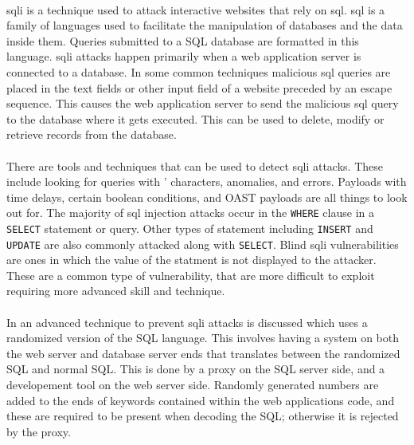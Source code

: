 \paragraph{}\acrfull{sqli} is a technique used to attack interactive websites that rely on \acrfull{sql}. \acrfull{sql} is a family of languages used to facilitate the manipulation of databases and the data inside them. Queries submitted to a SQL database are formatted in this language. \acrfull{sqli} attacks happen primarily when a web application server is connected to a database. In some common techniques malicious \acrshort{sql} queries are placed in the text fields or other input field of a website preceded by an escape sequence. This causes the web application server to send the malicious \acrshort{sql} query to the database where it gets executed. This can be used to delete, modify or retrieve records from the database.

\paragraph{}There are tools and techniques that can be used to detect \acrshort{sqli} attacks. These include looking for queries with ' characters, anomalies, and errors. Payloads with time delays, certain boolean conditions, and OAST payloads are all things to look out for. The majority of \acrshort{sql} injection attacks occur in the \texttt{WHERE} clause in a \texttt{SELECT} statement or query. Other types of statement including \texttt{INSERT} and \texttt{UPDATE} are also commonly attacked along with \texttt{SELECT}. Blind \acrshort{sqli} vulnerabilities are ones in which the value of the statment is not displayed to the attacker. These are a common type of vulnerability, that are more difficult to exploit requiring more advanced skill and technique. \autocite{noauthor_what_nodate}

\paragraph{}In \cite{boyd_sqlrand_2004} an advanced technique to prevent \acrshort{sqli} attacks is discussed which uses a randomized version of the SQL language. This involves having a system on both the web server and database server ends that translates between the randomized SQL and normal SQL. This is done by a proxy on the SQL server side, and a developement tool on the web server side. Randomly generated numbers are added to the ends of keywords contained within the web applications code, and these are required to be present when decoding the SQL; otherwise it is rejected by the proxy.

